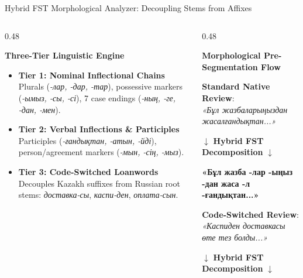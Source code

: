 \documentclass[aspectratio=169, 10pt]{beamer}
\newcommand{\subhead}[1]{{\normalsize\textbf{\color{DarkNavy}#1}\par\vspace{3pt}}}
\begin{document}
\begin{frame}{Hybrid FST Morphological Analyzer: Decoupling Stems from Affixes}
    \begin{columns}[T]
        \begin{column}{0.48\textwidth}
            \subhead{Three-Tier Linguistic Engine}
            \begin{itemize}\setlength{\itemsep}{4pt}\small
                \item \textbf{Tier 1: Nominal Inflectional Chains} \\
                {\footnotesize Plurals (\textit{-лар, -дар, -тар}), possessive markers (\textit{-ымыз, -сы, -сі}), 7 case endings (\textit{-ның, -ге, -дан, -мен}).}
                \item \textbf{Tier 2: Verbal Inflections \& Participles} \\
                {\footnotesize Participles (\textit{-ғандықтан, -атын, -йді}), person/agreement markers (\textit{-мын, -сің, -мыз}).}
                \item \textbf{Tier 3: Code-Switched Loanwords} \\
                {\footnotesize Decouples Kazakh suffixes from Russian root stems: \textit{доставка-сы}, \textit{каспи-ден}, \textit{оплата-сын}.}
            \end{itemize}
        \end{column}
        \begin{column}{0.48\textwidth}
            \subhead{Morphological Pre-Segmentation Flow}
            {\small\textbf{Standard Native Review}:}\\[1pt]
            {\footnotesize\textit{«Бұл жазбаларыңыздан жасалғандықтан...»}}\\[2pt]
            {\centering\footnotesize\color{SlateText}$\downarrow$ \textbf{Hybrid FST Decomposition} $\downarrow$\par}\vspace{2pt}
            {\footnotesize\color{DarkNavy}\textbf{«Бұл жазба {\color{TechCyan}-лар -ыңыз -дан} жаса {\color{TechCyan}-л -ғандықтан}...»}}\par
            \vspace{6pt}
            {\small\textbf{Code-Switched Review}:}\\[1pt]
            {\footnotesize\textit{«Каспиден доставкасы өте тез болды...»}}\\[2pt]
            {\centering\footnotesize\color{SlateText}$\downarrow$ \textbf{Hybrid FST Decomposition} $\downarrow$\par}\vspace{2pt}

\end{column}
\end{columns}
\end{frame}
\end{document}
